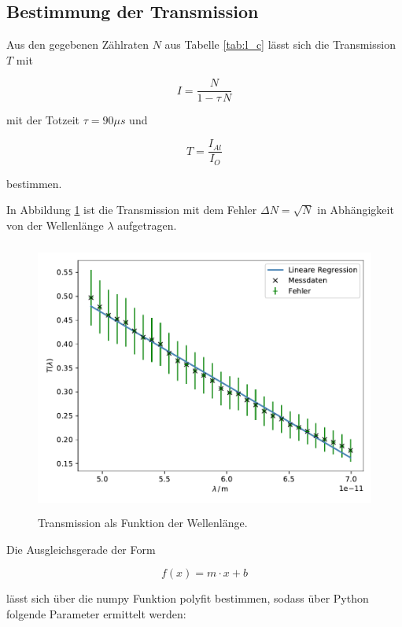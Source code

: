 \newpage
\subsection{Bestimmung der Transmission}
Aus den gegebenen Zählraten $N$ aus Tabelle \ref{tab:l_c} lässt sich die Transmission $T$ mit

\begin{equation}
I = \frac{N}{1 - \tau \, N}
\label{eqn:tot}
\end{equation}

\noindent
mit der Totzeit $\tau = 90 \mu s$ und 

\begin{equation}
T = \frac{I_{Al}}{I_O}
\label{eqn:trans}
\end{equation}

\noindent
bestimmen.

\noindent
In Abbildung \ref{fig:trans} ist die Transmission mit dem Fehler $\Delta N = \sqrt{N}$ in Abhängigkeit von der Wellenlänge $\lambda$ aufgetragen.

\begin{figure}
    \centering
       \includegraphics[height=9cm]{daten/transmission.pdf}
       \caption{Transmission als Funktion der Wellenlänge.}
       \label{fig:trans}
\end{figure}

\noindent
Die Ausgleichsgerade der Form

\begin{equation*}
f(x) = m \cdot x + b
\end{equation*}

\noindent
lässt sich über die numpy \cite{numpy} Funktion polyfit bestimmen, sodass über Python folgende Parameter ermittelt werden:

